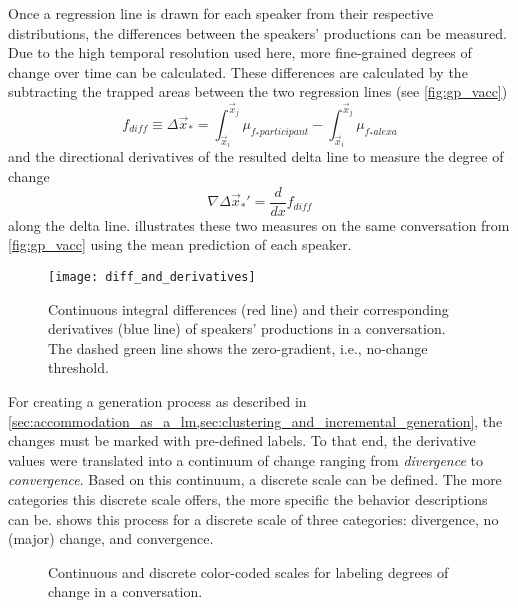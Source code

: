 Once a regression line is drawn for each speaker from their respective distributions, the differences between the speakers' productions can be measured.
Due to the high temporal resolution used here, more fine-grained degrees of change over time can be calculated.
These differences are calculated by the subtracting the trapped areas between the two regression lines (see \cref{fig:gp_vacc})
%
\begin{equation}
	f_{diff} \equiv\Delta\vec{x}_* =
	\int_{\vec{x}_i}^{\vec{x}_{j}}\mu_{f_*participant} -
	\int_{\vec{x}_i}^{\vec{x}_{j}}\mu_{f_*alexa}
\end{equation}
\noindent
%
and the directional derivatives of the resulted delta line to measure the degree of change
%
\begin{equation}
	\nabla\Delta\vec{x}_*' = \frac{d}{dx}f_{diff}
\end{equation}
%
along the delta line.
 illustrates these two measures on the same conversation from \cref{fig:gp_vacc} using the mean prediction of each speaker.
%
\begin{figure}[t]
	\centering
	\texttt{[image: diff\_and\_derivatives]}
	\caption[Continuous integral differences and derivatives in an interaction]
		{Continuous integral differences (red line) and their corresponding derivatives (blue line) of speakers' productions in a conversation.
		The dashed green line shows the zero-gradient, i.e., no-change threshold.}
	\label{fig:diff_and_derivatives}
\end{figure}
%
For creating a generation process as described in \cref{sec:accommodation_as_a_lm,sec:clustering_and_incremental_generation}, the changes must be marked with pre-defined labels.
To that end, the derivative values were translated into a continuum of change ranging from \textit{divergence} to \textit{convergence}.
Based on this continuum, a discrete scale can be defined.
The more categories this discrete scale offers, the more specific the behavior descriptions can be.
 shows this process for a discrete scale of three categories: divergence, no (major) change, and convergence.
%
\begin{figure}[t]
	\centering
	\hfill
	\caption[Continuous and discrete scales for labeling degrees of change]
		{Continuous and discrete color-coded scales for labeling degrees of change in a conversation.}
	\label{fig:cont_disc_scales}
\end{figure}

